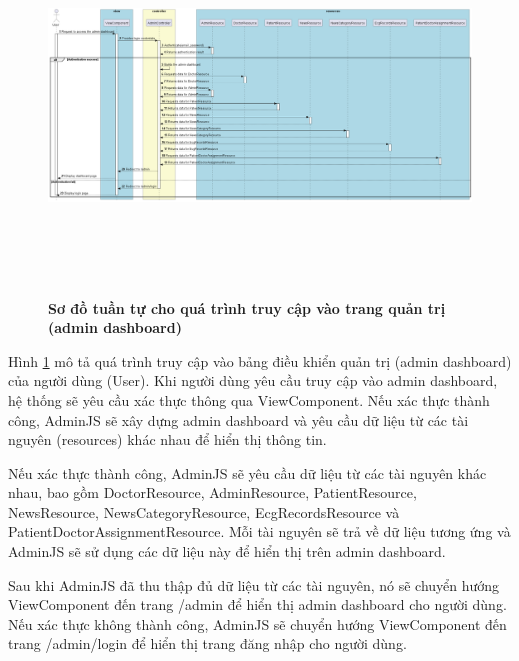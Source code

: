 \begin{enumerate}[a)]
\begin{figure}[H]
  \centering
  \includegraphics[width=16cm,height=10cm]{Images/server/sequence/web/seq_auth.png}
  \caption[Sơ đồ tuần tự cho quá trình truy cập vào trang quản trị (admin dashboard) ]{\bfseries \fontsize{12pt}{0pt}
  \selectfont Sơ đồ tuần tự cho quá trình truy cập vào trang quản trị (admin dashboard) }
  \label{seq_auth} %
\end{figure}
Hình \ref{seq_auth} mô tả quá trình truy cập vào bảng điều khiển quản trị (admin dashboard) của người dùng (User). Khi người dùng yêu cầu truy cập vào admin dashboard, hệ thống sẽ yêu cầu xác thực thông qua ViewComponent. Nếu xác thực thành công, AdminJS sẽ xây dựng admin dashboard và yêu cầu dữ liệu từ các tài nguyên (resources) khác nhau để hiển thị thông tin.



Nếu xác thực thành công, AdminJS sẽ yêu cầu dữ liệu từ các tài nguyên khác nhau, bao gồm DoctorResource, AdminResource, PatientResource, NewsResource, NewsCategoryResource, EcgRecordsResource và PatientDoctorAssignmentResource. Mỗi tài nguyên sẽ trả về dữ liệu tương ứng và AdminJS sẽ sử dụng các dữ liệu này để hiển thị trên admin dashboard.



Sau khi AdminJS đã thu thập đủ dữ liệu từ các tài nguyên, nó sẽ chuyển hướng ViewComponent đến trang /admin để hiển thị admin dashboard cho người dùng. Nếu xác thực không thành công, AdminJS sẽ chuyển hướng ViewComponent đến trang /admin/login để hiển thị trang đăng nhập cho người dùng.




\end{enumerate}
